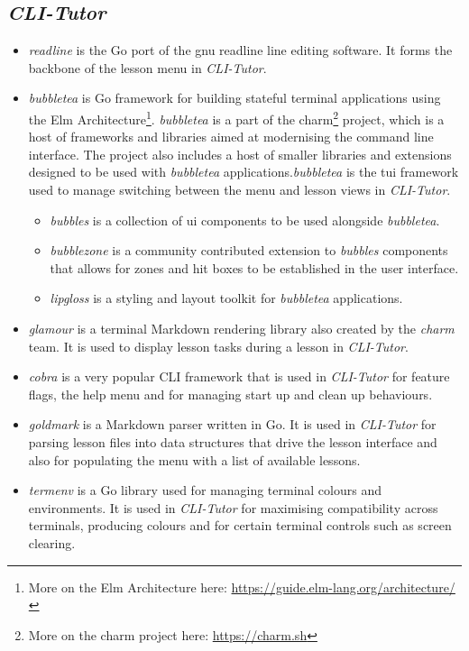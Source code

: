 \subsection{\textit{CLI-Tutor}}
\begin{itemize}
    \item \textit{readline} is the Go port of the gnu readline
        \cite{ramey_fox_readline} line editing software. It forms the backbone
        of the lesson menu in \textit{CLI-Tutor}.

    \item \textit{bubbletea} is Go framework for building stateful terminal
        applications using the Elm Architecture\footnote{More on the Elm
        Architecture here: \url{https://guide.elm-lang.org/architecture/}}.
        \textit{bubbletea} is a part of the charm\footnote{More on the charm
        project here: \url{https://charm.sh}} project, which is a host of
        frameworks and libraries aimed at modernising the command line
        interface. The project also includes a host of smaller libraries and
        extensions designed to be used with \textit{bubbletea}
        applications.\textit{bubbletea} is the tui framework used to manage
        switching between the menu and lesson views in \textit{CLI-Tutor}.

        \begin{itemize}
            \item \textit{bubbles} is a collection of ui components to be used alongside \textit{bubbletea}.
            \item \textit{bubblezone} is a community contributed extension to
                \textit{bubbles} components that allows for zones and hit boxes
                to be established in the user interface.
            \item \textit{lipgloss} is a styling and layout toolkit for \textit{bubbletea} applications.
        \end{itemize}

    \item \textit{glamour} is a terminal Markdown rendering library also
        created by the \textit{charm} team. It is used to display lesson tasks
        during a lesson in \textit{CLI-Tutor}.

    \item \textit{cobra} is a very popular CLI framework that is used in
        \textit{CLI-Tutor} for feature flags, the help menu and for managing
        start up and clean up behaviours.
        
    \item \textit{goldmark} is a Markdown parser written in Go. It is used in
        \textit{CLI-Tutor} for parsing lesson files into data structures that
        drive the lesson interface and also for populating the menu with a list
        of available lessons.

    \item \textit{termenv}  is a Go library used for managing terminal colours
        and environments. It is used in \textit{CLI-Tutor} for maximising
        compatibility across terminals, producing colours and for certain
        terminal controls such as screen clearing.
\end{itemize}

